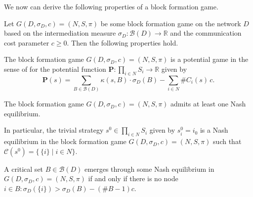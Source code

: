 We now can derive the following properties of a block formation game.
\begin{theorem}
Let $G (D, \sigma_D ,c ) = (N,S, \pi )$ be some block formation game on the network $D$ based on the intermediation measure $\sigma_D \colon \mathcal{B} (D) \to \mathbb{R}$ and the communication cost parameter $c \geqslant 0$. Then the following properties hold.
\begin{numm}
\item The block formation game $G (D, \sigma_D ,c ) = (N,S, \pi )$ is a potential game in the sense of \citet{MondererShapley1996} for the potential function $\mathbf{P} \colon \prod_{i \in N} S_i \to \mathbb{R}$ given by
\[
\mathbf{P} (s) = \sum_{B \in \mathcal{B} (D)} \kappa (s,B) \cdot \sigma_D (B) - \sum_{i \in N} \# C_i (s) \, c .
\]

\item The block formation game $G (D, \sigma_D ,c) = (N,S, \pi )$ admits at least one Nash equilibrium.

\item In particular, the trivial strategy $s^0 \in \prod_{i \in N} S_i$ given by $s^0_i = i_0$ is a Nash equilibrium in the block formation game $G (D, \sigma_D ,c) = (N,S, \pi )$ such that $\mathcal{C} (s^0) = \{ \, \{ i \} \mid i \in N \}$.

\item A critical set $B \in \mathcal{B} (D)$ emerges through some Nash equilibrium in $G (D, \sigma_D ,c) = (N,S, \pi )$ if and only if there is no node $i \in B \colon \sigma_D (\{ i \}) > \sigma_D (B) - (\# B -1)c$.
\end{numm}
\end{theorem}
